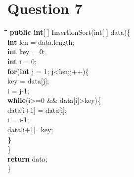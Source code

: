 \documentclass[a4paper,12pt]{article}
\begin{document}
\section{Question 7}

{\small
\begin{tabbing}	
\hspace*{15mm}\=\hspace*{10mm}\=
\hspace*{5mm}\=\hspace*{5mm}\=\hspace*{5mm}\=\kill	
\textbf{public int}[ ] InsertionSort(int[ ] data)\{\\
\>\textbf{int} len = data.length;\\
\>\textbf{int} key = 0;\\
\>\textbf{int} i = 0;\\
\>\textbf{for}(\textbf{int} j = 1; j<len;j++)\{\\
\>\>key = data[j];\\
\>\>i = j-1;\\
\>\>\textbf{while}(i>=0 \&\& data[i]>key)\{\\
\>\>\>\>data[i+1] = data[i];\\
\>\>\>\>i = i-1;\\
\>\>\>\>data[i+1]=key;\\
\>\>\textbf{\}}\\
\>\}\\
\>\textbf{return} data;\\
\}
\end{tabbing}	
}
\end{document}
